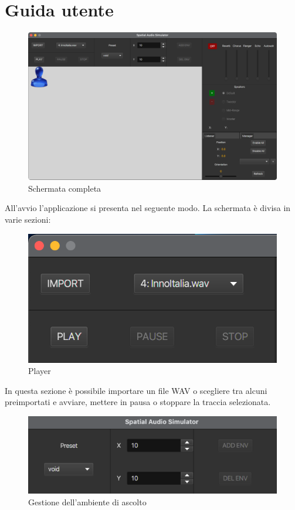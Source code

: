 \documentclass[a4paper,12pt]{report}
\begin{document}
\chapter{Guida utente}
\begin{figure}[H]
\centering{}
\includegraphics[width=\textwidth]{img/guide/full.png}
\caption{Schermata completa}
\label{img:fullapp}
\end{figure}
%
All'avvio l'applicazione si presenta nel seguente modo. La schermata è divisa in varie sezioni: 
%
\begin{figure}[H]
\centering{}
\includegraphics[width=.75\textwidth]{img/guide/song.png}
\caption{Player}
\label{img:player}
\end{figure}
%
In questa sezione è possibile importare un file WAV o scegliere tra alcuni preimportati e avviare, mettere in pausa o stoppare la traccia selezionata.
%
\begin{figure}[H]
\centering{}
\includegraphics[width=.75\textwidth]{img/guide/space.png}
\caption{Gestione dell'ambiente di ascolto}
\label{img:space}
\end{figure}
\end{document}
